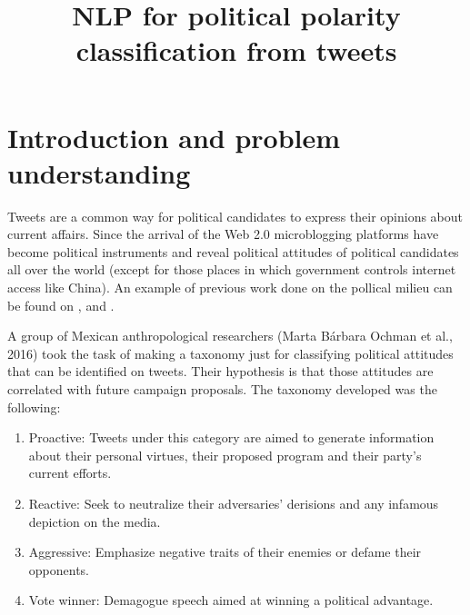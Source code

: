 \documentclass[author-year, review]{elsarticle} %
\let\parencite\cite
\begin{document}
\begin{frontmatter}

  \title{\protect\hypertarget{_Hlk498998102}{}{}NLP for political polarity
classification from tweets}
      \author{\protect}
    
  \begin{abstract}
  
  \end{abstract}
  
 \end{frontmatter}


\small


\section{Introduction and problem
understanding}\label{introduction-and-problem-understanding}

Tweets are a common way for political candidates to express their
opinions about current affairs. Since the arrival of the Web 2.0
microblogging platforms have become political instruments and reveal
political attitudes of political candidates all over the world (except
for those places in which government controls internet access like
China). An example of previous work done on the pollical milieu can be
found on
\parencite{2010},
\parencite{2011}
and
\parencite{22012}.

A group of Mexican anthropological researchers (Marta Bárbara Ochman et
al., 2016) took the task of making a taxonomy just for classifying
political attitudes that can be identified on tweets. Their hypothesis
is that those attitudes are correlated with future campaign proposals.
The taxonomy developed was the following:

\begin{enumerate}
\def\labelenumi{\arabic{enumi}.}
\item
  Proactive: Tweets under this category are aimed to generate
  information about their personal virtues, their proposed program and
  their party's current efforts.
\item
  Reactive: Seek to neutralize their adversaries' derisions and any
  infamous depiction on the media.
\item
  Aggressive: Emphasize negative traits of their enemies or defame their
  opponents.
\item
  Vote winner: Demagogue speech aimed at winning a political advantage.
\end{enumerate}
\end{document}
